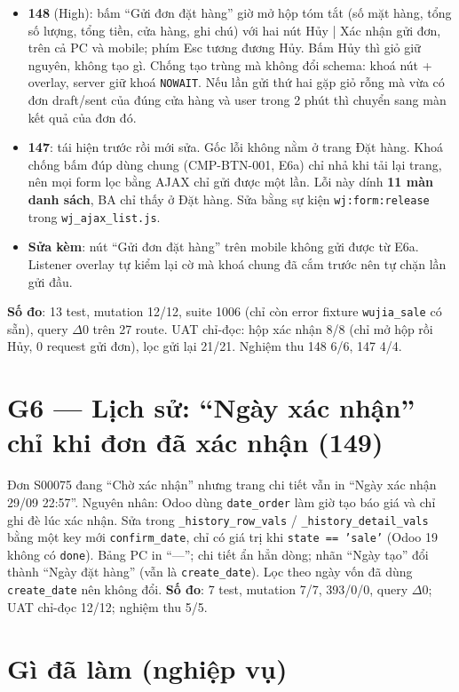 \begin{itemize}[nosep]
\item \textbf{148} (High): bấm ``Gửi đơn đặt hàng'' giờ mở hộp tóm tắt (số mặt hàng, tổng số lượng, tổng tiền, cửa hàng,
  ghi chú) với hai nút Hủy | Xác nhận gửi đơn, trên cả PC và mobile; phím Esc tương đương Hủy. Bấm Hủy thì giỏ giữ nguyên,
  không tạo gì. Chống tạo trùng mà không đổi schema: khoá nút + overlay, server giữ khoá \texttt{NOWAIT}. Nếu lần gửi thứ hai
  gặp giỏ rỗng mà vừa có đơn draft/sent của đúng cửa hàng và user trong 2 phút thì chuyển sang màn kết quả của đơn đó.
\item \textbf{147}: tái hiện trước rồi mới sửa. Gốc lỗi không nằm ở trang Đặt hàng. Khoá chống bấm đúp dùng chung
  (CMP-BTN-001, E6a) chỉ nhả khi tải lại trang, nên mọi form lọc bằng AJAX chỉ gửi được một lần. Lỗi này dính
  \textbf{11 màn danh sách}, BA chỉ thấy ở Đặt hàng. Sửa bằng sự kiện \texttt{wj:form:release} trong
  \texttt{wj\_ajax\_list.js}.
\item \textbf{Sửa kèm}: nút ``Gửi đơn đặt hàng'' trên mobile không gửi được từ E6a. Listener overlay tự kiểm lại cờ mà khoá
  chung đã cắm trước nên tự chặn lần gửi đầu.
\end{itemize}
\textbf{Số đo}: 13 test, mutation 12/12, suite 1006 (chỉ còn error fixture \texttt{wujia\_sale} có sẵn), query $\Delta$0 trên
27 route. UAT chỉ-đọc: hộp xác nhận 8/8 (chỉ mở hộp rồi Hủy, 0 request gửi đơn), lọc gửi lại 21/21. Nghiệm thu 148 6/6,
147 4/4.

\section{G6 --- Lịch sử: ``Ngày xác nhận'' chỉ khi đơn đã xác nhận (149)}

Đơn S00075 đang ``Chờ xác nhận'' nhưng trang chi tiết vẫn in ``Ngày xác nhận 29/09 22:57''. Nguyên nhân: Odoo dùng
\texttt{date\_order} làm giờ tạo báo giá và chỉ ghi đè lúc xác nhận. Sửa trong \texttt{\_history\_row\_vals} /
\texttt{\_history\_detail\_vals} bằng một key mới \texttt{confirm\_date}, chỉ có giá trị khi \texttt{state == 'sale'}
(Odoo 19 không có \texttt{done}). Bảng PC in ``---''; chi tiết ẩn hẳn dòng; nhãn ``Ngày tạo'' đổi thành
``Ngày đặt hàng'' (vẫn là \texttt{create\_date}). Lọc theo ngày vốn đã dùng \texttt{create\_date} nên không đổi.
\textbf{Số đo}: 7 test, mutation 7/7, 393/0/0, query $\Delta$0; UAT chỉ-đọc 12/12; nghiệm thu 5/5.

\section{Gì đã làm (nghiệp vụ)}

